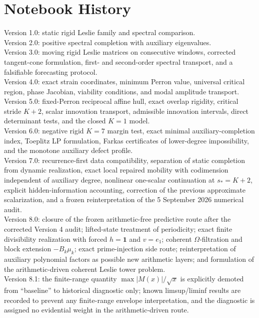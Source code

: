 \documentclass[11pt]{amsart}
\numberwithin{equation}{section}
\theoremstyle{plain}
\theoremstyle{definition}
\theoremstyle{remark}
\begin{document}
\section*{Notebook History}
Version 1.0: static rigid Leslie family and spectral comparison.\\
Version 2.0: positive spectral completion with auxiliary eigenvalues.\\
Version 3.0: moving rigid Leslie matrices on consecutive windows, corrected tangent-cone formulation, first- and second-order spectral transport, and a falsifiable forecasting protocol.\\
Version 4.0: exact strain coordinates, minimum Perron value, universal critical region, phase Jacobian, viability conditions, and modal amplitude transport.\\
Version 5.0: fixed-Perron reciprocal affine hull, exact overlap rigidity, critical stride $K+2$, scalar innovation transport, admissible innovation intervals, direct determinant tests, and the closed $K=1$ model.\\
Version 6.0: negative rigid $K=7$ margin test, exact minimal auxiliary-completion index, Toeplitz LP formulation, Farkas certificates of lower-degree impossibility, and the monotone auxiliary defect profile.\\
Version 7.0: recurrence-first data compatibility, separation of static completion from dynamic realization, exact local repaired mobility with codimension independent of auxiliary degree, nonlinear one-scalar continuation at $s_*=K+2$, explicit hidden-information accounting, correction of the previous approximate scalarization, and a frozen reinterpretation of the 5 September 2026 numerical audit.\\
Version 8.0: closure of the frozen arithmetic-free predictive route after the corrected Version 4 audit; lifted-state treatment of periodicity; exact finite divisibility realization with forced $h=\mathbf1$ and $v=e_1$; coherent $\Omega$-filtration and block extension $-B_k\mu_k$; exact prime-injection side route; reinterpretation of auxiliary polynomial factors as possible new arithmetic layers; and formulation of the arithmetic-driven coherent Leslie tower problem.\\
Version 8.1: the finite-range quantity $\max |M(x)|/\sqrt{x}$ is explicitly demoted from ``baseline'' to historical diagnostic only; known limsup/liminf results are recorded to prevent any finite-range envelope interpretation, and the diagnostic is assigned no evidential weight in the arithmetic-driven route.\\
\end{document}

